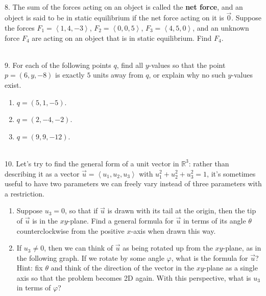 \documentclass{article}
\begin{document}
~\\

8. The sum of the forces acting on an object is called the \textbf{net force}, and an object is said to be in static equilibrium if the net force acting on it is $\vec{0}$. Suppose the forces $F_1 = \left< 1, 4, -3 \right>$, $F_2 = \left< 0, 0, 5 \right>$, $F_3 = \left< 4, 5, 0 \right>$, and an unknown force $F_4$ are acting on an object that is in static equilibrium. Find $F_4$.

~\\

9. For each of the following points $q$, find all $y$-values so that the point $p = (6, y, -8)$ is exactly $5$ units away from $q$, or explain why no such $y$-values exist.

\begin{enumerate}

	\item $q = (5, 1, -5)$.

	\item $q = (2, -4, -2)$.

	\item $q = (9, 9, -12)$.

\end{enumerate}

~\\

10. Let's try to find the general form of a unit vector in $\mathbb{R}^3$: rather than describing it as a vector $\vec{u} = \left< u_1, u_2, u_3 \right>$ with $u_1^2 + u_2^2 + u_3^2 = 1$, it's sometimes useful to have two parameters we can freely vary instead of three parameters with a restriction.

\begin{enumerate}

	\item Suppose $u_3 = 0$, so that if $\vec{u}$ is drawn with its tail at the origin, then the tip of $\vec{u}$ is in the $xy$-plane. Find a general formula for $\vec{u}$ in terms of its angle $\theta$ counterclockwise from the positive $x$-axis when drawn this way.

	\item If $u_3 \neq 0$, then we can think of $\vec{u}$ as being rotated up from the $xy$-plane, as in the following graph. If we rotate by some angle $\varphi$, what is the formula for $\vec{u}$? Hint: fix $\theta$ and think of the direction of the vector in the $xy$-plane as a single axis so that the problem becomes 2D again. With this perspective, what is $u_3$ in terms of $\varphi$?

\end{enumerate}
\end{document}

